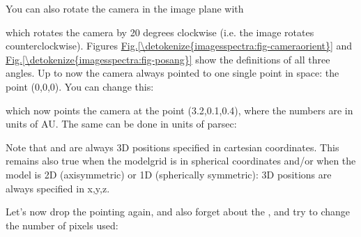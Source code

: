 \documentclass[letterpaper,10pt,english]{sphinxmanual}
\begin{document}
You can also rotate the camera in the image plane with

\begin{sphinxVerbatim}[commandchars=\\\{\}]
         
\end{sphinxVerbatim}

which rotates the camera by 20 degrees clockwise (i.e. the image rotates
counter\sphinxhyphen{}clockwise). Figures \hyperref[\detokenize{imagesspectra:fig-cameraorient}]{Fig.\@ \ref{\detokenize{imagesspectra:fig-cameraorient}}} and \hyperref[\detokenize{imagesspectra:fig-posang}]{Fig.\@ \ref{\detokenize{imagesspectra:fig-posang}}} show
the definitions of all three angles. Up to now the camera always pointed to one
single point in space: the point (0,0,0). You can change this:

\begin{sphinxVerbatim}[commandchars=\\\{\}]
             
\end{sphinxVerbatim}

which now points the camera at the point (3.2,0.1,0.4), where the numbers are in
units of AU. The same can be done in units of parsec:

\begin{sphinxVerbatim}[commandchars=\\\{\}]
             
\end{sphinxVerbatim}

Note that  and  are always 3\sphinxhyphen{}D positions specified in
cartesian coordinates. This remains also true when the model\sphinxhyphen{}grid is in
spherical coordinates and/or when the model is 2\sphinxhyphen{}D (axisymmetric) or 1\sphinxhyphen{}D
(spherically symmetric): 3\sphinxhyphen{}D positions are always specified in x,y,z.

Let’s now drop the pointing again, and also forget about the , and try
to change the number of pixels used:
\end{document}
